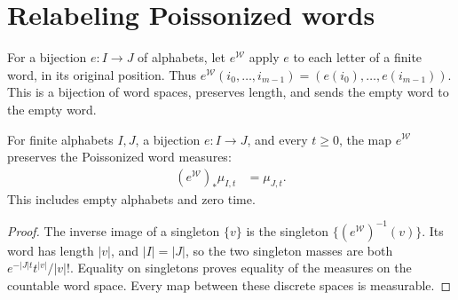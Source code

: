 \section{Relabeling Poissonized words}
\label{sec:poisson_word_relabel}

\begin{definition}
\label{def:poisson_word_relabel}
\leanok
{}
For a bijection $e:I\to J$ of alphabets, let $e^{\mathcal W}$ apply $e$
to each letter of a finite word, in its original position. Thus
$e^{\mathcal W}(i_0,\ldots,i_{m-1})=(e(i_0),\ldots,e(i_{m-1}))$.
This is a bijection of word spaces, preserves length, and sends the empty
word to the empty word.
\end{definition}

\begin{theorem}
\label{thm:poisson_word_relabel}
\leanok
{}
For finite alphabets $I,J$, a bijection $e:I\to J$, and every $t\geq0$,
the map $e^{\mathcal W}$ preserves the Poissonized word measures:
\begin{align}
 (e^{\mathcal W})_*\mu_{I,t}&=\mu_{J,t}.
 \label{eq:poisson_relabel_law}
\end{align}
This includes empty alphabets and zero time.
\end{theorem}
\begin{proof}
\leanok
{}
The inverse image of a singleton $\{v\}$ is the singleton
$\{(e^{\mathcal W})^{-1}(v)\}$. Its word has length $|v|$, and $|I|=|J|$,
so the two singleton masses are both $e^{-|J|t}t^{|v|}/|v|!$.
Equality on singletons proves equality of the measures on the countable
word space. Every map between these discrete spaces is measurable.
\end{proof}
